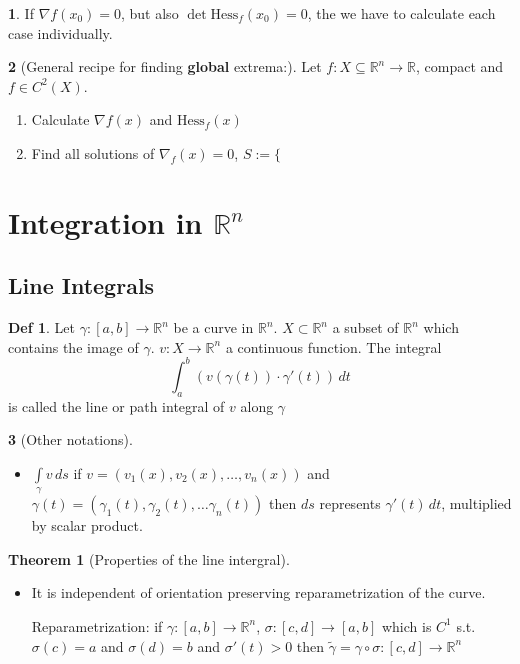 \documentclass[a4paper, 10pt]{article}
\theoremstyle{definition}
\newtheorem*{definition}{Def}
\theoremstyle{colored}
\newtheorem*{note_wrapper}{}
\theoremstyle{ex}
\theoremstyle{named}
\newtheorem*{ntheorem_wrapper}{Theorem}
\newenvironment{ntheorem}%
    {\begin{mdframed}[style=important]\begin{ntheorem_wrapper}}%
    {\end{ntheorem_wrapper}\end{mdframed}}
\newenvironment{note}%
    {\begin{mdframed}[style=trick]\begin{note_wrapper}}%
    {\end{note_wrapper}\end{mdframed}}
\newcommand{\R}{\mathbb{R}}
\begin{document}
\begin{note}
    If \(\nabla f(x_0) = 0\), but also \(\det \text{Hess}_f(x_0) = 0\), the we have to calculate each case individually.
\end{note}

\begin{note}[General recipe for finding \textbf{global} extrema:]
    Let \(f: X \subseteq \R^n \to \R\), compact and \(f \in C^2(X)\).
    \begin{enumerate}
        \item Calculate \(\nabla f(x)\) and \(\text{Hess}_f(x)\)
        \item Find all solutions of \(\nabla_f(x) = 0\), \(S := \{\)
    \end{enumerate}
\end{note}

\section*{Integration in \(\R^n\)}
\subsection*{Line Integrals}

\begin{definition}
    Let \(\gamma: [a, b] \to \R^n\) be a curve in \(\R^n\). \(X \subset \R^n\) a subset of \(\R^n\) which contains the image of \(\gamma\). \(v: X \to \R^n\) a continuous function. The integral
    \[\int_a^b (v(\gamma(t)) \cdot \gamma'(t)) \, dt\]
    is called the line or path integral of \(v\) along \(\gamma\)
\end{definition}

\begin{note}[Other notations] \ \\
    \begin{itemize}
        \item \(\int\limits_\gamma v \,ds\) if \(v = (v_1(x), v_2(x), \ldots, v_n(x))\) and \(\gamma(t) = (\gamma_1(t), \gamma_2(t), \ldots \gamma_n(t))\) then \(ds\) represents \(\gamma'(t) \,dt\), multiplied by scalar product.
    \end{itemize}
\end{note}

\begin{ntheorem}[Properties of the line intergral] \ \\
    \begin{itemize}
        \item It is independent of orientation preserving reparametrization of the curve.
        
        Reparametrization: if \(\gamma: [a, b] \to \R^n\), \(\sigma: [c, d] \to [a, b]\) which is \(C^1\) s.t. \(\sigma(c) = a\) and \(\sigma(d) = b\) and \(\sigma'(t) > 0\) then \(\tilde{\gamma} = \gamma \circ \sigma: [c, d] \to \R^n\)
    \end{itemize}
\end{ntheorem}
\end{document}
